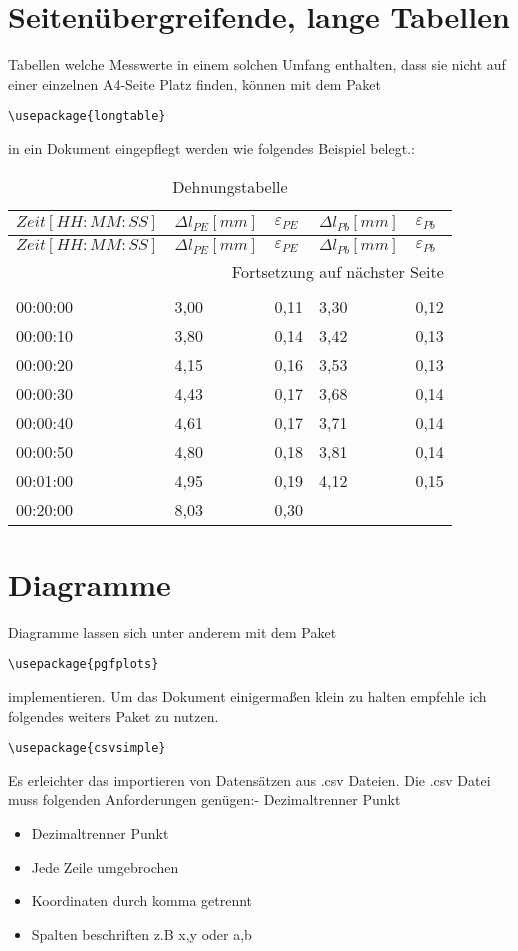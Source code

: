 \section{Seitenübergreifende, lange Tabellen}

Tabellen welche Messwerte in einem solchen Umfang enthalten, dass sie nicht auf einer einzelnen A4-Seite Platz finden, können mit dem Paket \begin{verbatim}
\usepackage{longtable} 
\end{verbatim}
in ein Dokument eingepflegt werden wie folgendes Beispiel belegt.:
\begin{longtable}[c]{lllll}
	\caption{Dehnungstabelle}\\
	\label{alles}
	$Zeit [HH:MM:SS]$ & $\Delta l_{PE} [mm]$ & $\varepsilon_{PE}$ & $\Delta l_{Pb} [mm]$ & $\varepsilon_{Pb}$ \\
	\hline
	\endfirsthead
	$Zeit [HH:MM:SS]$ & $\Delta l_{PE} [mm]$ & $\varepsilon_{PE}$ & $\Delta l_{Pb} [mm]$ & $\varepsilon_{Pb}$ \\ 
	\hline
	\endhead
	\multicolumn{5}{r}{Fortsetzung auf n{\"a}chster Seite}\\
	\endfoot
	\hline
	\multicolumn{5}{r}{} \\
	\endlastfoot
	00:00:00 & 3,00 & 0,11 & 3,30 & 0,12\\
	00:00:10 & 3,80 & 0,14 & 3,42 & 0,13\\
	00:00:20 & 4,15 & 0,16 & 3,53 & 0,13\\
	00:00:30 & 4,43 & 0,17 & 3,68 & 0,14\\
	00:00:40 & 4,61 & 0,17 & 3,71 & 0,14\\
	00:00:50 & 4,80 & 0,18 & 3,81 & 0,14\\
	00:01:00 & 4,95 & 0,19 & 4,12 & 0,15\\
	00:20:00 & 8,03 & 0,30 &  & \\
\end{longtable} 

\section{Diagramme}
Diagramme lassen sich unter anderem mit dem Paket 
\begin{verbatim}
\usepackage{pgfplots} 
\end{verbatim}
implementieren.
Um das Dokument einigermaßen klein zu halten empfehle ich folgendes weiters Paket zu nutzen.
\begin{verbatim}
\usepackage{csvsimple} 
\end{verbatim}
Es erleichter das importieren von Datensätzen aus .csv Dateien. Die .csv Datei muss folgenden Anforderungen genügen:- Dezimaltrenner Punkt
\begin{itemize}
	\item Dezimaltrenner Punkt
	\item Jede Zeile umgebrochen
	\item Koordinaten durch komma getrennt
	\item Spalten beschriften z.B x,y oder a,b
\end{itemize}


